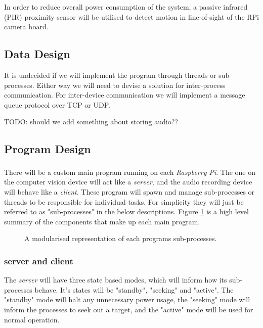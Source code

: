 \documentclass[11pt,a4paper,titlepage]{report}
\newcommand{\rpi}{\textit{Raspberry Pi\textsuperscript{\textregistered}}}
\begin{document}
In order to reduce overall power consumption of the system, a passive infrared (PIR) proximity sensor will be utilised to detect motion in line-of-sight of the RPi camera board. 

\subsection{Data Design}

It is undecided if we will implement the program through threads or sub-processes. Either way we will need to devise a solution for inter-process communication. {\color{red}For inter-device communication we will implement a message queue protocol over TCP or UDP.}

{\color{red} TODO: should we add something about storing audio??}

\subsection{Program Design}

There will be a custom main program running on each \rpi. The one on the computer vision device will act like a \textit{server}, and the audio recording device will behave like a \textit{client}. These program will spawn and manage sub-processes or threads to be responsible for individual tasks. For simplicity they will just be referred to as "sub-processes" in the below descriptions. Figure \ref{fig:processes} is a high level summary of the components that make up each main program.

\begin{figure}
\begin{multicols}{2}
\columnbreak
{}
\end{multicols}
\caption{A modularised representation of each programs sub-processes.}\label{fig:processes}
\end{figure}

\subsubsection{server and client}


The \textit{server} will have three state based modes, which will inform how its sub-processes behave. It's states will be "standby", "seeking" and "active". The "standby" mode will halt any unnecessary power usage, the "seeking" mode will inform the processes to seek out a target, and the "active" mode will be used for normal operation. 
\end{document}
